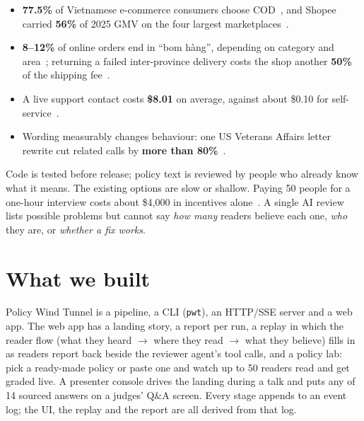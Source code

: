 \documentclass[11pt,a4paper]{article}
\newcommand{\code}[1]{\texttt{#1}}
\begin{document}
\begin{itemize}
  \item \textbf{77.5\%} of Vietnamese e-commerce consumers choose COD~\cite{cod}, and Shopee carried \textbf{56\%} of 2025 GMV on the four largest marketplaces~\cite{metric}.
  \item \textbf{8--12\%} of online orders end in ``bom hàng'', depending on category and area~\cite{vecom}; returning a failed inter-province delivery costs the shop another \textbf{50\%} of the shipping fee~\cite{ghn}.
  \item A live support contact costs \textbf{\$8.01} on average, against about \$0.10 for self-service~\cite{gartner}.
  \item Wording measurably changes behaviour: one US Veterans Affairs letter rewrite cut related calls by \textbf{more than 80\%}~\cite{senate}.
\end{itemize}

Code is tested before release; policy text is reviewed by people who already know what it means. The existing options are slow or shallow. Paying 50 people for a one-hour interview costs about \$4{,}000 in incentives alone~\cite{ui}. A single AI review lists possible problems but cannot say \emph{how many} readers believe each one, \emph{who} they are, or \emph{whether a fix works}.

\section{What we built}

Policy Wind Tunnel is a pipeline, a CLI (\code{pwt}), an HTTP/SSE server and a web app. The web app has a landing story, a report per run, a replay in which the reader flow (what they heard $\to$ where they read $\to$ what they believe) fills in as readers report back beside the reviewer agent's tool calls, and a policy lab: pick a ready-made policy or paste one and watch up to 50 readers read and get graded live. A presenter console drives the landing during a talk and puts any of 14 sourced answers on a judges' Q\&A screen. Every stage appends to an event log; the UI, the replay and the report are all derived from that log.
\end{document}
